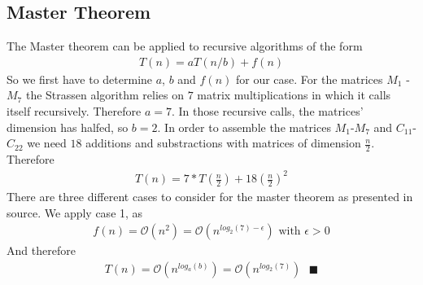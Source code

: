 \documentclass[11pt,a4paper]{article}
\begin{document}
\subsection{Master Theorem}
The Master theorem can be applied to recursive algorithms of the form
\newline
\begin{align}
    T(n)=aT(n/b)+f(n)
\end{align}
\newline
So we first have to determine $a$, $b$ and $f(n)$ for our case. For the matrices $M_1$ - $M_7$ the Strassen algorithm relies on $7$ matrix multiplications in which it calls itself recursively. Therefore $a=7$. In those recursive calls, the matrices' dimension has halfed, so $b=2$. In order to assemble the matrices $M_1$-$M_7$ and $C_{11}$-$C_{22}$ we need $18$ additions and substractions with matrices of dimension $\frac{n}{2}$. Therefore
\newline
\begin{align} \label{start}
    T(n) = 7*T\left(\frac{n}{2}\right) + 18\left(\frac{n}{2}\right)^2
\end{align}
\newline
There are three different cases to consider for the master theorem as presented in source. We apply case 1, as
\newline
\begin{align}
    f(n) = \mathcal{O}\left(n^2\right) = \mathcal{O}\left(n^{log_2(7)-\epsilon}\right) \text{ with } \epsilon > 0
\end{align}
\newline
And therefore 
\newline
\begin{align}
    T(n) = \mathcal{O}\left(n^{log_a(b)}\right) = \mathcal{O}\left(n^{log_2(7)}\right) \text{ } \blacksquare
\end{align}
\newpage
\end{document}

